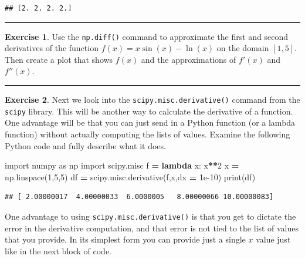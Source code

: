 \documentclass[
]{book}
\newenvironment{Shaded}{\begin{snugshade}}{\end{snugshade}}
\newcommand{\BuiltInTok}[1]{#1}
\newcommand{\DecValTok}[1]{\textcolor[rgb]{0.00,0.00,0.81}{#1}}
\newcommand{\FloatTok}[1]{\textcolor[rgb]{0.00,0.00,0.81}{#1}}
\newcommand{\ImportTok}[1]{#1}
\newcommand{\KeywordTok}[1]{\textcolor[rgb]{0.13,0.29,0.53}{\textbf{#1}}}
\newcommand{\NormalTok}[1]{#1}
\newcommand{\OperatorTok}[1]{\textcolor[rgb]{0.81,0.36,0.00}{\textbf{#1}}}
\theoremstyle{definition}
\theoremstyle{definition}
\theoremstyle{definition}
\newtheorem{exercise}{Exercise}[chapter]
\theoremstyle{remark}
\begin{document}
\begin{verbatim}
## [2. 2. 2. 2.]
\end{verbatim}

\begin{center}\rule{0.5\linewidth}{0.5pt}\end{center}

\begin{exercise}
\protect\hypertarget{exr:unnamed-chunk-219}{}{\label{exr:unnamed-chunk-219} }Use the \texttt{np.diff()} command to approximate the first and second derivatives of the function \(f(x) = x\sin(x) - \ln(x)\) on the domain \([1,5]\). Then create a plot that shows \(f(x)\) and the approximations of \(f'(x)\) and \(f''(x)\).
\end{exercise}

\begin{center}\rule{0.5\linewidth}{0.5pt}\end{center}

\begin{exercise}
\protect\hypertarget{exr:unnamed-chunk-220}{}{\label{exr:unnamed-chunk-220} }Next we look into the \texttt{scipy.misc.derivative()} command from the \texttt{scipy} library. This will be another way to calculate the derivative of a function. One advantage will be that you can just send in a Python function (or a lambda function) without actually computing the lists of values. Examine the following Python code and fully describe what it does.
\end{exercise}

\begin{Shaded}
\begin{Highlighting}[]
\ImportTok{import}\NormalTok{ numpy }\ImportTok{as}\NormalTok{ np}
\ImportTok{import}\NormalTok{ scipy.misc}
\NormalTok{f }\OperatorTok{=} \KeywordTok{lambda}\NormalTok{ x: x}\OperatorTok{**}\DecValTok{2}
\NormalTok{x }\OperatorTok{=}\NormalTok{ np.linspace(}\DecValTok{1}\NormalTok{,}\DecValTok{5}\NormalTok{,}\DecValTok{5}\NormalTok{)}
\NormalTok{df }\OperatorTok{=}\NormalTok{ scipy.misc.derivative(f,x,dx }\OperatorTok{=} \FloatTok{1e{-}10}\NormalTok{)}
\BuiltInTok{print}\NormalTok{(df)}
\end{Highlighting}
\end{Shaded}

\begin{verbatim}
## [ 2.00000017  4.00000033  6.0000005   8.00000066 10.00000083]
\end{verbatim}

One advantage to using \texttt{scipy.misc.derivative()} is that you get to dictate the error in the derivative computation, and that error is not tied to the list of values that you provide. In its simplest form you can provide just a single \(x\) value just like in the next block of code.
\end{document}
